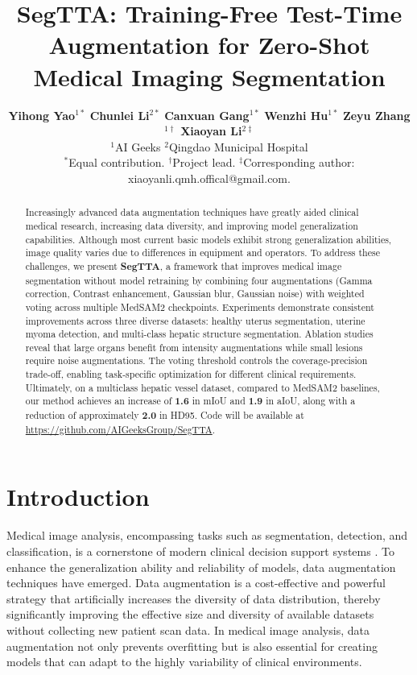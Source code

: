 \documentclass{article}
\title{SegTTA: Training-Free Test-Time Augmentation for Zero-Shot Medical Imaging Segmentation
}
\author{
    \textbf{Yihong Yao}$^{1*}$ \quad
    \textbf{Chunlei Li}$^{2*}$ \quad
    \textbf{Canxuan Gang}$^{1*}$ \quad
    \textbf{Wenzhi Hu}$^{1*}$ \quad
    \textbf{Zeyu Zhang}$^{1\dag}$ \quad
    \textbf{Xiaoyan Li}$^{2\ddag}$ \vspace{0.1cm}\\
    $^{1}$AI Geeks \quad
    $^{2}$Qingdao Municipal Hospital \vspace{0.06cm}\\
    \small $^*$Equal contribution. $^\dag$Project lead.
    $^\ddag$Corresponding author: xiaoyanli.qmh.offical@gmail.com.
}
\begin{document}
\maketitle


\begin{abstract}
Increasingly advanced data augmentation techniques have greatly aided clinical medical research, increasing data diversity, and improving model generalization capabilities. Although most current basic models exhibit strong generalization abilities, image quality varies due to differences in equipment and operators. To address these challenges, we present \textbf{SegTTA}, a framework that improves medical image segmentation without model retraining by combining four augmentations (Gamma correction, Contrast enhancement, Gaussian blur, Gaussian noise) with weighted voting across multiple MedSAM2 checkpoints. Experiments demonstrate consistent improvements across three diverse datasets: healthy uterus segmentation, uterine myoma detection, and multi-class hepatic structure segmentation. Ablation studies reveal that large organs benefit from intensity augmentations while small lesions require noise augmentations. The voting threshold controls the coverage-precision trade-off, enabling task-specific optimization for different clinical requirements. Ultimately, on a multiclass hepatic vessel dataset, compared to MedSAM2 baselines, our method achieves an increase of \textbf{1.6} in mIoU and \textbf{1.9} in aIoU, along with a reduction of approximately \textbf{2.0} in HD95.
Code will be available at \url{https://github.com/AIGeeksGroup/SegTTA}.
\end{abstract}




\section{Introduction}

Medical image analysis, encompassing tasks such as segmentation, detection, and classification, is a cornerstone of modern clinical decision support systems \cite{goceri2023medical}. To enhance the generalization ability and reliability of models, data augmentation techniques have emerged\cite{lopes2019improving}. Data augmentation is a cost-effective and powerful strategy that artificially increases the diversity of data distribution, thereby significantly improving the effective size and diversity of available datasets without collecting new patient scan data. In medical image analysis, data augmentation not only prevents overfitting but is also essential for creating models that can adapt to the highly variability of clinical environments\cite{qi2025mediaug}.
\end{document}
